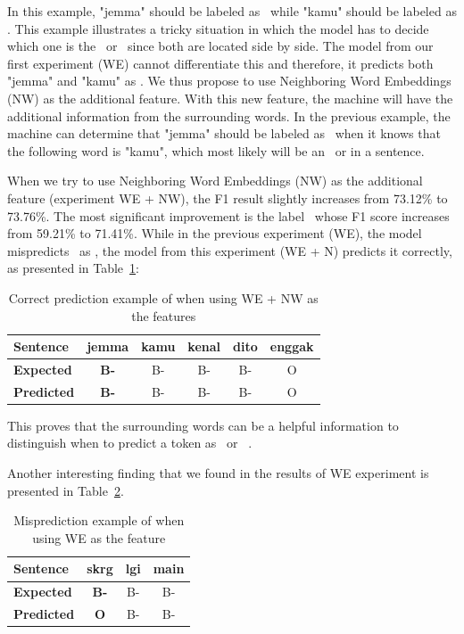 In this example, "jemma" should be labeled as \greet~while "kamu" should be labeled as \agent. This example illustrates a tricky situation in which the model has to decide which one is the \agent~or \greet~since both are located side by side. The model from our first experiment (WE) cannot differentiate this and therefore, it predicts both "jemma" and "kamu" as \agent. We thus propose to use Neighboring Word Embeddings (NW) as the additional feature. With this new feature, the machine will have the additional information from the surrounding words. In the previous example, the machine can determine that "jemma" should be labeled as \greet~when it knows that the following word is "kamu", which most likely will be an \agent~or \patient in a sentence.

When we try to use Neighboring Word Embeddings (NW) as the additional feature (experiment WE + NW), the F1 result slightly increases from 73.12\% to 73.76\%. The most significant improvement is the label \greet~whose F1 score increases from 59.21\% to 71.41\%. While in the previous experiment (WE), the model mispredicts \greet~as \agent, the model from this experiment (WE + N) predicts it correctly, as presented in Table~\ref{tab:contohgreetagenttrue}:

\begin{table}
	\centering
	\caption{Correct prediction example of \greet when using WE + NW as the features}
	\label{tab:contohgreetagenttrue}
	\begin{tabular}{|l|ccccc|}
		\hline
		\textbf{Sentence} 				& jemma & kamu & kenal & dito & enggak \\
		\hline
		\textbf{Expected}				& \textbf{B-\greet} & B-\agent & B-\predicate & B-\patient  & O\\
		\hline
		\textbf{Predicted}		& \textbf{B-\greet} & B-\agent & B-\predicate & B-\patient  & O\\
		\hline
	\end{tabular}
\end{table}

This proves that the surrounding words can be a helpful information to distinguish when to predict a token as \greet~or ~\agent.

Another interesting finding that we found in the results of WE experiment is presented in Table~\ref{tab:contohwaktufalse}.

\begin{table}
	\centering
	\caption{Misprediction example of \timesrl when using WE as the feature}
	\label{tab:contohwaktufalse}
	\begin{tabular}{|l|ccc|}
		\hline
		\textbf{Sentence} 				& skrg & lgi & main \\
		\hline
		\textbf{Expected}				& \textbf{B-\timesrl} & B-\modal & B-\predicate\\
		\hline
		\textbf{Predicted}		& \textbf{O} & B-\modal & B-\predicate \\
		\hline
	\end{tabular}
\end{table}

